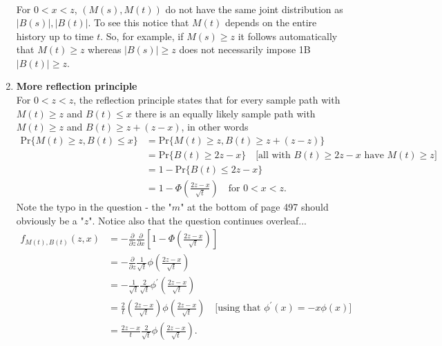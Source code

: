 \documentclass[11pt,a4paper]{article}
\begin{document}
\begin{enumerate}
\begin{align*}
    \end{align*}
    For $0 < x < z$, $(M(s), M(t))$ do not have the same joint distribution as $|B(s)|, |B(t)|$. To see this notice that $M(t)$ depends on the entire history up to time $t$. So, for example, if $M(s) \geq z$ it follows automatically that $M(t) \geq z$ whereas $|B(s)| \geq z$ does not necessarily impose 1B $|B(t)| \geq z$.
    \item \textbf{More reflection principle}\\
    For $0 < z < z$, the reflection principle states that for every sample path with $M(t) \geq z$ and $B(t)\leq x$  there is an equally likely sample path with $M(t) \geq z$ and $B(t) \geq z + (z - x)$, in other words
    \begin{align*}
      \text{Pr}\{M(t) \geq z, B(t)\leq x\}
      &= \text{Pr}\{M(t) \geq z, B(t)\geq z + (z - z)\}\\
      &= \text{Pr}\{B(t) \geq 2z - x\}\quad \text{[all with $B(t)\geq 2z - x$ have $M(t) \geq z$]}\\
      &= 1 - \text{Pr}\{B(t) \leq 2z - x\}\\
      &= 1 - \Phi\left(\frac{2z - x}{\sqrt{t}}\right)\quad\text{for $0 < x < z$}.
    \end{align*}
    Note the typo in the question - the "$m$" at the bottom of page 497 should obviously be a "$z$".
    Notice also that the question continues overleaf... 
    \begin{align*}
      f_{M(t), B(t)}(z,x)
      &= -\frac{\partial}{\partial z}\frac{\partial}{\partial x}\left[1 - \Phi\left(\frac{2z - x}{\sqrt{t}}\right)\right]\\
      &= -\frac{\partial}{\partial z}\frac{1}{\sqrt{t}}\phi\left(\frac{2z - x}{\sqrt{t}}\right)\\
      &= -\frac{1}{\sqrt{t}}\frac{2}{\sqrt{t}}\phi^\prime\left(\frac{2z - x}{\sqrt{t}}\right)\\
      &= \frac{2}{t}\left(\frac{2z - x}{\sqrt{t}}\right)\phi\left(\frac{2z - x}{\sqrt{t}}\right)\quad\text{[using that $\phi^\prime(x) = -x\phi(x)$]}\\
      &= \frac{2z - x}{t}\frac{2}{\sqrt{t}}\phi\left(\frac{2z - x}{\sqrt{t}}\right).
    \end{align*}
  \end{enumerate}
\end{document}
